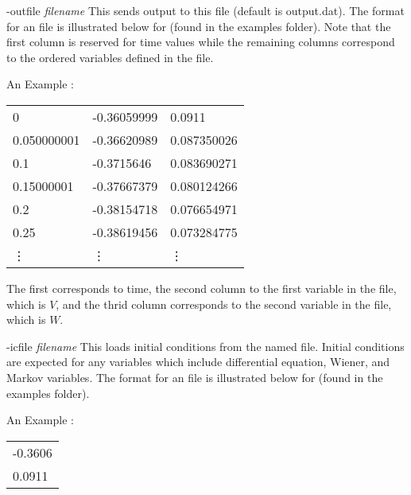 \begin{description}
\begin{center}
\end{center}
\item{-outfile \emph{filename}} This sends output to this file (default is output.dat).  The format for an {} file is illustrated below for {} (found in the examples {} folder).  Note that the first column is reserved for time values while the remaining columns correspond to the ordered variables defined in the {} file.  
\begin{center}
\begin{minipage}{55ex}
\begin{center}An Example {}:
\end{center}\ttfamily
\begin{tabular}{lll}
0 & -0.36059999 & 0.0911 \\
0.050000001 & -0.36620989 & 0.087350026 \\ 
0.1 & -0.3715646 & 0.083690271 \\
0.15000001 & -0.37667379 & 0.080124266 \\ 
0.2 & -0.38154718 & 0.076654971 \\
0.25 & -0.38619456 & 0.073284775 \\ 
\vdots & \vdots & \vdots\\
\end{tabular}
\end{minipage}
\end{center}
The first corresponds to time, the second column to the first variable in the {} file, which is $V$, and the thrid column corresponds to the second variable in the {} file, which is $W$. 
\item{-icfile \emph{filename}} This loads initial conditions from the named file. Initial conditions are expected for any variables which include differential equation, Wiener, and Markov variables.  The format for an {} file is illustrated below for {} (found in the examples {} folder).  
\begin{center}
\begin{minipage}{55ex}
\begin{center}An Example {}:
\end{center}\ttfamily
\begin{tabular}{l}
-0.3606\\
0.0911 \\
\end{tabular}
\end{minipage}

\end{center}
\end{description}
